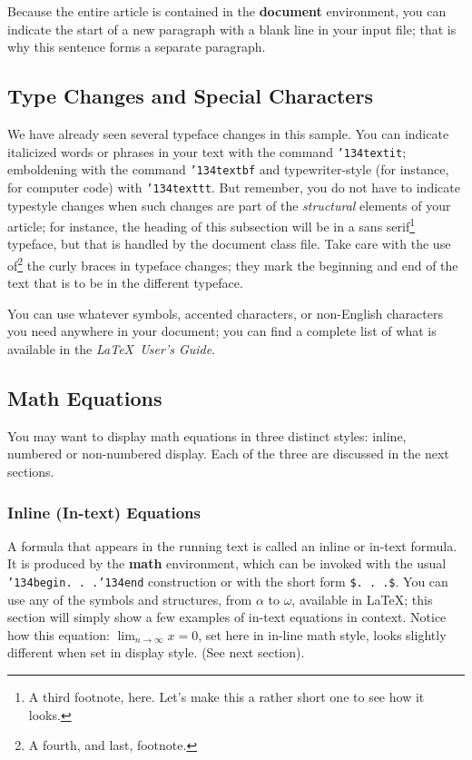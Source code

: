 \documentclass{acm_proc_article-sp}
\begin{document}
Because the entire article is contained in
the \textbf{document} environment, you can indicate the
start of a new paragraph with a blank line in your
input file; that is why this sentence forms a separate paragraph.

\subsection{Type Changes and {\subsecit Special} Characters}
We have already seen several typeface changes in this sample.  You
can indicate italicized words or phrases in your text with
the command \texttt{{\char'134}textit}; emboldening with the
command \texttt{{\char'134}textbf}
and typewriter-style (for instance, for computer code) with
\texttt{{\char'134}texttt}.  But remember, you do not
have to indicate typestyle changes when such changes are
part of the \textit{structural} elements of your
article; for instance, the heading of this subsection will
be in a sans serif\footnote{A third footnote, here.
Let's make this a rather short one to
see how it looks.} typeface, but that is handled by the
document class file. Take care with the use
of\footnote{A fourth, and last, footnote.}
the curly braces in typeface changes; they mark
the beginning and end of
the text that is to be in the different typeface.

You can use whatever symbols, accented characters, or
non-English characters you need anywhere in your document;
you can find a complete list of what is
available in the \textit{\LaTeX\
User's Guide}\cite{Lamport:LaTeX}.

\subsection{Math Equations}
You may want to display math equations in three distinct styles:
inline, numbered or non-numbered display.  Each of
the three are discussed in the next sections.

\subsubsection{Inline (In-text) Equations}
A formula that appears in the running text is called an
inline or in-text formula.  It is produced by the
\textbf{math} environment, which can be
invoked with the usual \texttt{{\char'134}begin. . .{\char'134}end}
construction or with the short form \texttt{\$. . .\$}. You
can use any of the symbols and structures,
from $\alpha$ to $\omega$, available in
\LaTeX\cite{Lamport:LaTeX}; this section will simply show a
few examples of in-text equations in context. Notice how
this equation: \begin{math}\lim_{n\rightarrow \infty}x=0\end{math},
set here in in-line math style, looks slightly different when
set in display style.  (See next section).
\end{document}
